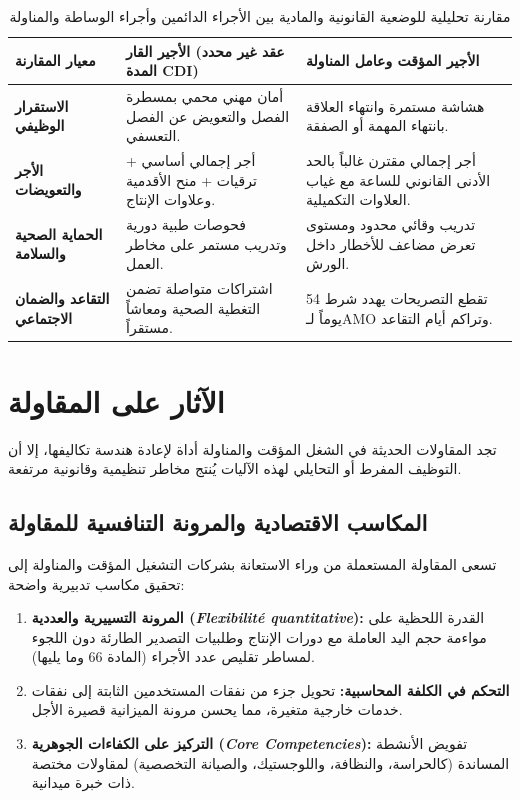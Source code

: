 \begin{table}[htbp]
\centering
\small
\renewcommand{\arraystretch}{1.5}
\begin{tabularx}{\textwidth}{|p{3.2cm}|X|X|}
\hline
\rowcolor{maincolor!20}
\textbf{معيار المقارنة} & \textbf{الأجير القار (عقد غير محدد المدة \textenglish{CDI})} & \textbf{الأجير المؤقت وعامل المناولة} \\
\hline
\textbf{الاستقرار الوظيفي} & أمان مهني محمي بمسطرة الفصل والتعويض عن الفصل التعسفي. & هشاشة مستمرة وانتهاء العلاقة بانتهاء المهمة أو الصفقة. \\
\hline
\textbf{الأجر والتعويضات} & أجر إجمالي أساسي + ترقيات + منح الأقدمية وعلاوات الإنتاج. & أجر إجمالي مقترن غالباً بالحد الأدنى القانوني للساعة مع غياب العلاوات التكميلية. \\
\hline
\textbf{الحماية الصحية والسلامة} & فحوصات طبية دورية وتدريب مستمر على مخاطر العمل. & تدريب وقائي محدود ومستوى تعرض مضاعف للأخطار داخل الورش. \\
\hline
\textbf{التقاعد والضمان الاجتماعي} & اشتراكات متواصلة تضمن التغطية الصحية ومعاشاً مستقراً. & تقطع التصريحات يهدد شرط \textenglish{54} يوماً لـ\textenglish{AMO} وتراكم أيام التقاعد. \\
\hline
\end{tabularx}
\caption{مقارنة تحليلية للوضعية القانونية والمادية بين الأجراء الدائمين وأجراء الوساطة والمناولة}
\label{tab:comparaison-salaries}
\end{table}

\section{الآثار على المقاولة}

تجد المقاولات الحديثة في الشغل المؤقت والمناولة أداة لإعادة هندسة تكاليفها، إلا أن التوظيف المفرط أو التحايلي لهذه الآليات يُنتج مخاطر تنظيمية وقانونية مرتفعة.

\subsection{المكاسب الاقتصادية والمرونة التنافسية للمقاولة}
تسعى المقاولة المستعملة من وراء الاستعانة بشركات التشغيل المؤقت والمناولة إلى تحقيق مكاسب تدبيرية واضحة:
\begin{enumerate}[leftmargin=*, itemsep=5pt]
    \item \textbf{المرونة التسييرية والعددية (\textit{Flexibilité quantitative}):} القدرة اللحظية على مواءمة حجم اليد العاملة مع دورات الإنتاج وطلبيات التصدير الطارئة دون اللجوء لمساطر تقليص عدد الأجراء (المادة \textenglish{66} وما يليها).
    \item \textbf{التحكم في الكلفة المحاسبية:} تحويل جزء من نفقات المستخدمين الثابتة إلى نفقات خدمات خارجية متغيرة، مما يحسن مرونة الميزانية قصيرة الأجل.
    \item \textbf{التركيز على الكفاءات الجوهرية (\textit{Core Competencies}):} تفويض الأنشطة المساندة (كالحراسة، والنظافة، واللوجستيك، والصيانة التخصصية) لمقاولات مختصة ذات خبرة ميدانية.
\end{enumerate}

